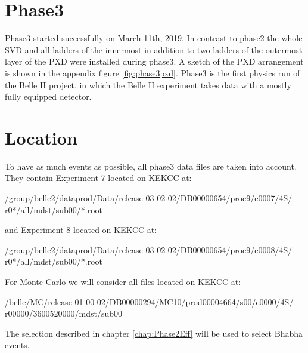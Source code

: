 \documentclass[a4paper,11pt,twosided,final,german,openbib,pdftex,listof=totoc,bibliography=totoc]{scrbook}
\begin{document}
\section{Phase3}
\label{sec:P3}

Phase3 started successfully on March 11th, 2019. In contrast to phase2 the whole SVD and all ladders of the innermost in addition to two ladders of the outermost layer of the PXD were installed during phase3. A sketch of the PXD arrangement is shown in the appendix figure \ref{fig:phase3pxd}. Phase3 is the first physics run of the Belle II project, in which the Belle II experiment takes data with a mostly fully equipped detector.\cite{phase3}

\section{Location}

To have as much events as possible, all phase3 data files are taken into account. They contain Experiment 7 located on KEKCC at:
\newline

/group/belle2/dataprod/Data/release-03-02-02/DB00000654/proc9/e0007/4S/
r0*/all/mdst/sub00/*.root
\newline 

and Experiment 8 located on KEKCC at:
\newline

/group/belle2/dataprod/Data/release-03-02-02/DB00000654/proc9/e0008/4S/
r0*/all/mdst/sub00/*.root
\newline

For Monte Carlo we will consider all files located on KEKCC at:
\newline 

/belle/MC/release-01-00-02/DB00000294/MC10/prod00004664/s00/e0000/4S/
r00000/3600520000/mdst/sub00
\newline

The selection described in chapter \ref{chap:Phase2Eff} will be used to select Bhabha events.
\end{document}
